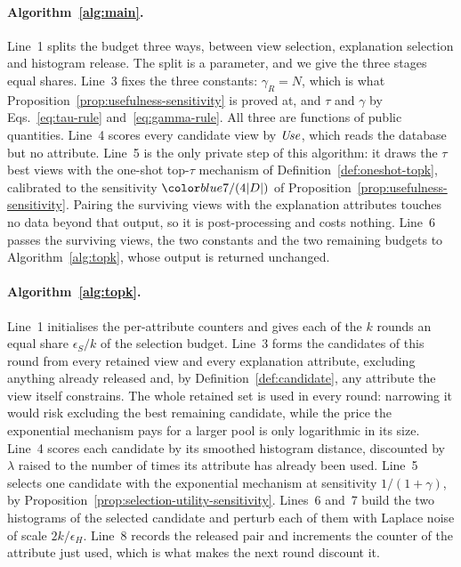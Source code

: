 \paragraph{Algorithm~\ref{alg:main}.}
Line~1 splits the budget three ways, between view selection, explanation selection and histogram release.
The split is a parameter, and we give the three stages equal shares.
Line~3 fixes the three constants: $\gamma_R=N$, which is what Proposition~\ref{prop:usefulness-sensitivity} is proved at, and $\tau$ and $\gamma$ by Eqs.~\eqref{eq:tau-rule} and~\eqref{eq:gamma-rule}. All three are functions of public quantities.
Line~4 scores every candidate view by $\mathit{Use}$, which reads the database but no attribute.
Line~5 is the only private step of this algorithm: it draws the $\tau$ best views with the one-shot top-$\tau$ mechanism of Definition~\ref{def:oneshot-topk}, calibrated to the sensitivity $\added{7/(4|D|)}$ of Proposition~\ref{prop:usefulness-sensitivity}.
Pairing the surviving views with the explanation attributes touches no data beyond that output, so it is post-processing and costs nothing.
Line~6 passes the surviving views, the two constants and the two remaining budgets to Algorithm~\ref{alg:topk}, whose output is returned unchanged.

\paragraph{Algorithm~\ref{alg:topk}.}
Line~1 initialises the per-attribute counters and gives each of the $k$ rounds an equal share $\epsilon_S/k$ of the selection budget.
Line~3 forms the candidates of this round from every retained view and every explanation attribute, excluding anything already released and, by Definition~\ref{def:candidate}, any attribute the view itself constrains.
The whole retained set is used in every round: narrowing it would risk excluding the best remaining candidate, while the price the exponential mechanism pays for a larger pool is only logarithmic in its size.
Line~4 scores each candidate by its smoothed histogram distance, discounted by $\lambda$ raised to the number of times its attribute has already been used.
Line~5 selects one candidate with the exponential mechanism at sensitivity $1/(1+\gamma)$, by Proposition~\ref{prop:selection-utility-sensitivity}.
Lines~6 and~7 build the two histograms of the selected candidate and perturb each of them with Laplace noise of scale $2k/\epsilon_H$.
Line~8 records the released pair and increments the counter of the attribute just used, which is what makes the next round discount it.

